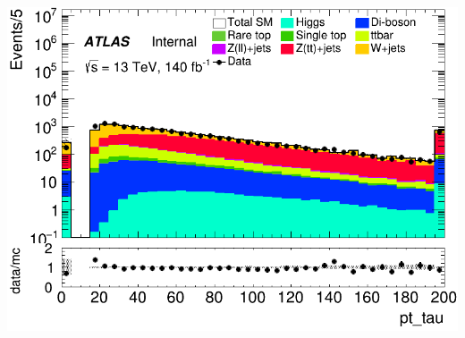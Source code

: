 \documentclass[usenames,dvipsnames]{beamer}
\begin{document}
\begin{frame}
\begin{minipage}{0.32\textwidth}
        \includegraphics[width=\textwidth]{graphics/HH_met/HH_met_pt_tau.png}
    \end{minipage}
    
    \vspace{0.5cm} %
\end{frame}
\end{document}
